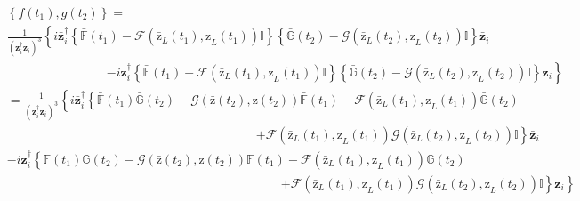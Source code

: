 \documentclass[aps,preprint]{revtex4}%
\begin{document}
\begin{align}
&  \left\{  f\left(  t_{1}\right)  ,g\left(  t_{2}\right)  \right\}
=\nonumber\\
&  \frac{1}{\left(  \mathbf{z}_{i}^{\dagger}\mathbf{z}_{i}\right)  ^{3}%
}\left\{  i\mathbf{\bar{z}}_{i}^{\dagger}\left\{  \mathbb{\bar{F}}\left(
t_{1}\right)  -\mathcal{F}\left(  \mathrm{\bar{z}}_{L}\left(  t_{1}\right)
\mathrm{,z}_{L}\left(  t_{1}\right)  \right)  \mathbb{I}\right\}  \left\{
\mathbb{\bar{G}}\left(  t_{2}\right)  -\mathcal{G}\left(  \mathrm{\bar{z}}%
_{L}\left(  t_{2}\right)  \mathrm{,z}_{L}\left(  t_{2}\right)  \right)
\mathbb{I}\right\}  \mathbf{\bar{z}}_{i}\right. \nonumber\\
&  \qquad\qquad\qquad\qquad\left.  -i\mathbf{z}_{i}^{\dagger}\left\{
\mathbb{\bar{F}}\left(  t_{1}\right)  -\mathcal{F}\left(  \mathrm{\bar{z}}%
_{L}\left(  t_{1}\right)  \mathrm{,z}_{L}\left(  t_{1}\right)  \right)
\mathbb{I}\right\}  \left\{  \mathbb{\bar{G}}\left(  t_{2}\right)
-\mathcal{G}\left(  \mathrm{\bar{z}}_{L}\left(  t_{2}\right)  \mathrm{,z}%
_{L}\left(  t_{2}\right)  \right)  \mathbb{I}\right\}  \mathbf{z}_{i}\right\}
\nonumber\\
&  =\frac{1}{\left(  \mathbf{z}_{i}^{\dagger}\mathbf{z}_{i}\right)  ^{3}%
}\left\{  i\mathbf{\bar{z}}_{i}^{\dagger}\left\{  \mathbb{\bar{F}}\left(
t_{1}\right)  \mathbb{\bar{G}}\left(  t_{2}\right)  -\mathcal{G}\left(
\mathrm{\bar{z}}\left(  t_{2}\right)  \mathrm{,z}\left(  t_{2}\right)
\right)  \mathbb{\bar{F}}\left(  t_{1}\right)  -\mathcal{F}\left(
\mathrm{\bar{z}}_{L}\left(  t_{1}\right)  \mathrm{,z}_{L}\left(  t_{1}\right)
\right)  \mathbb{\bar{G}}\left(  t_{2}\right)  \right.  \right. \nonumber\\
&  \qquad\qquad\qquad\qquad\qquad\qquad\qquad\qquad\qquad\qquad\left.
+\mathcal{F}\left(  \mathrm{\bar{z}}_{L}\left(  t_{1}\right)  \mathrm{,z}%
_{L}\left(  t_{1}\right)  \right)  \mathcal{G}\left(  \mathrm{\bar{z}}%
_{L}\left(  t_{2}\right)  \mathrm{,z}_{L}\left(  t_{2}\right)  \right)
\mathbb{I}\right\}  \mathbf{\bar{z}}_{i}\nonumber\\
&  -i\mathbf{z}_{i}^{\dagger}\left\{  \mathbb{F}\left(  t_{1}\right)
\mathbb{G}\left(  t_{2}\right)  -\mathcal{G}\left(  \mathrm{\bar{z}}\left(
t_{2}\right)  \mathrm{,z}\left(  t_{2}\right)  \right)  \mathbb{F}\left(
t_{1}\right)  -\mathcal{F}\left(  \mathrm{\bar{z}}_{L}\left(  t_{1}\right)
\mathrm{,z}_{L}\left(  t_{1}\right)  \right)  \mathbb{G}\left(  t_{2}\right)
\right. \nonumber\\
&  \qquad\qquad\qquad\qquad\qquad\qquad\qquad\qquad\qquad\qquad\qquad\left.
\left.  +\mathcal{F}\left(  \mathrm{\bar{z}}_{L}\left(  t_{1}\right)
\mathrm{,z}_{L}\left(  t_{1}\right)  \right)  \mathcal{G}\left(
\mathrm{\bar{z}}_{L}\left(  t_{2}\right)  \mathrm{,z}_{L}\left(  t_{2}\right)
\right)  \mathbb{I}\right\}  \mathbf{z}_{i}\right\}
\end{align}
\end{document}

